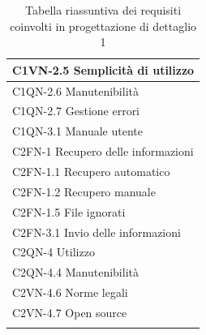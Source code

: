 \begin{footnotesize}
\begin{longtable}[!h]{|l|}
C1VN-2.5 Semplicit\`a di utilizzo \\ \hline
C1QN-2.6 Manutenibilit\`a \\ \hline             
C1QN-2.7 Gestione errori \\ \hline      
C1QN-3.1 Manuale utente \\ \hline
C2FN-1 Recupero delle informazioni \\ \hline
C2FN-1.1 Recupero automatico \\ \hline
C2FN-1.2 Recupero manuale \\ \hline
C2FN-1.5 File ignorati \\ \hline
C2FN-3.1 Invio delle informazioni \\ \hline
C2QN-4 Utilizzo \\ \hline
C2QN-4.4 Manutenibilit\`a \\ \hline
C2VN-4.6 Norme legali \\ \hline
C2VN-4.7 Open source \\ \hline
\caption{Tabella riassuntiva dei requisiti coinvolti in progettazione di
dettaglio 1}
\end{longtable}
\end{footnotesize}

